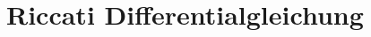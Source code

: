 %
%
%
\newcommand{\dt}[0]{\frac{d}{dt}}

\chapter{Riccati Differentialgleichung\label{chapter:kra}}
\begin{refsection}
      
      
      
      \printbibliography[heading=subbibliography]
\end{refsection}
